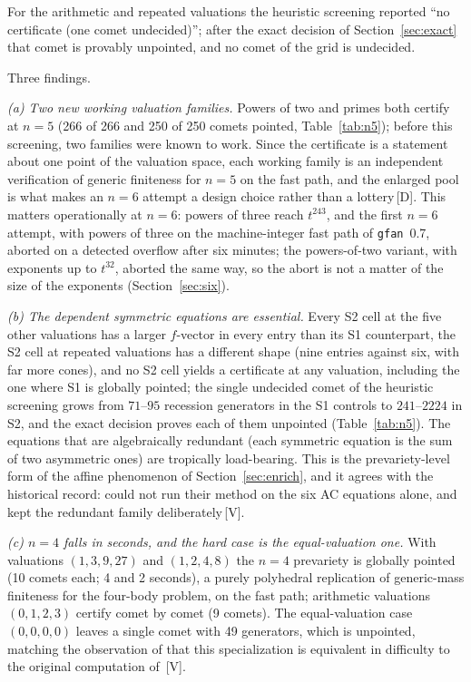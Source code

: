 \documentclass[11pt]{article}
\theoremstyle{definition}
\theoremstyle{remark}
\newcommand{\mk}[1]{\,{\scriptsize[#1]}}
\newcommand{\Dm}{\mk{D}}
\newcommand{\Vm}{\mk{V}}
\begin{document}
For the arithmetic and repeated valuations the heuristic screening reported ``no certificate (one
comet undecided)''; after the exact decision of Section~\ref{sec:exact} that comet is provably unpointed,
and no comet of the grid is undecided.

Three findings.

\emph{(a) Two new working valuation families.} Powers of two and primes both
certify at $n=5$ (266 of 266 and 250 of 250 comets pointed, Table~\ref{tab:n5}); before this screening,
two families were known to work. Since
the certificate is a statement about one point of the valuation space, each working family is an independent verification of generic finiteness for $n=5$ on the fast path,
and the enlarged pool is what makes an $n=6$ attempt a design choice rather than
a lottery\Dm. This matters operationally at $n=6$: powers of three reach $t^{243}$, and the first $n=6$
attempt, with powers of three on the machine-integer fast path of \texttt{gfan}~0.7, aborted on a detected overflow after six minutes; the
powers-of-two variant, with exponents up to $t^{32}$, aborted the same way, so the abort is not a matter of the size of the exponents (Section~\ref{sec:six}).

\emph{(b) The dependent symmetric equations are essential.} Every S2 cell at the five
other valuations has a larger $f$-vector in every entry than its S1 counterpart, the S2 cell at repeated
valuations has a different shape (nine entries against six, with far more cones), and no S2 cell yields a certificate at any valuation, including the one where S1 is
globally pointed; the single undecided comet of the heuristic screening grows from $71$--$95$
recession generators in the S1 controls to $241$--$2224$ in S2, and the exact decision
proves each of them unpointed (Table~\ref{tab:n5}). The equations that are algebraically redundant
(each symmetric equation is the sum of two asymmetric ones) are tropically
load-bearing. This is the prevariety-level form of the affine phenomenon of
Section~\ref{sec:enrich}, and it agrees with the historical record: \cite{HM06} could not run
their method on the six AC equations alone, and \cite{HJ11} kept the redundant
family deliberately\Vm.

\emph{(c) $n=4$ falls in seconds, and the hard case is the equal-valuation
one.} With valuations $(1,3,9,27)$ and $(1,2,4,8)$ the $n=4$ prevariety is
globally pointed (10 comets each; 4 and 2 seconds), a purely polyhedral
replication of generic-mass finiteness for the four-body problem, on the fast path; arithmetic
valuations $(0,1,2,3)$ certify comet by comet (9 comets). The equal-valuation case
$(0,0,0,0)$ leaves a single comet with 49 generators, which is unpointed, matching the
observation of \cite{JL25} that this specialization is equivalent in difficulty
to the original computation of \cite{HM06}\Vm.
\end{document}
